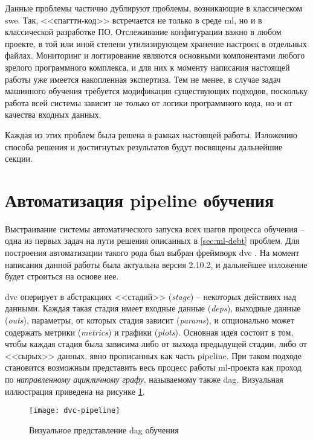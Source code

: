 Данные проблемы частично дублируют проблемы, возникающие в классическом \gls{swe}.
Так, <<спагтти-код>> встречается не только в среде \acrshort{ml}, но и в классической разработке ПО.
Отслеживание конфигурации важно в любом проекте, в той или иной степени утилизирующем хранение настроек в отдельных файлах.
Мониторинг и логгирование являются основными компонентами любого зрелого программного комплекса, и для них к моменту написания настоящей работы уже имеется накопленная экспертиза.
Тем не менее, в случае задач машинного обучения требуется модификация существующих подходов, поскольку работа всей системы зависит не только от логики программного кода, но и от качества входных данных.

Каждая из этих проблем была решена в рамках настоящей работы.
Изложению способа решения и достигнутых результатов будут посвящены дальнейшие секции.
\section{Автоматизация \gls{pipeline} обучения}
\label{sec:dvc-pipeline}
Выстраивание системы автоматического запуска всех шагов процесса обучения -- одна из первых задач на пути решения описанных в \ref{sec:ml-debt} проблем.
Для построения автоматизации такого рода был выбран фреймворк \gls{dvc} \cite{cite:dvc}.
На момент написания данной работы была актуальна версия 2.10.2, и дальнейшее изложение будет строиться на основе нее.

\Gls{dvc} оперирует в абстракциях <<стадий>> (\textit{stage}) -- некоторых действиях над данными.
Каждая такая стадия имеет входные данные (\textit{deps}), выходные данные (\textit{outs}), параметры, от которых стадия зависит (\textit{params}), и опционально может содержать метрики (\textit{metrics}) и графики (\textit{plots}).
Основная идея состоит в том, чтобы каждая стадия была зависима либо от выхода предыдущей стадии, либо от <<сырых>> данных, явно прописанных как часть \gls{pipeline}.
При таком подходе становится возможным представить весь процесс работы \acrshort{ml}-проекта как проход по \textit{направленному ацикличному графу}, называемому также \acrfull{dag}.
Визуальная иллюстрация приведена на рисунке \ref{fig:dvc-pipeline}.

\begin{figure}[!h]
    \centering
    \texttt{[image: dvc-pipeline]}
    \caption{Визуальное представление \acrshort{dag} обучения}
    \label{fig:dvc-pipeline}
\end{figure}


